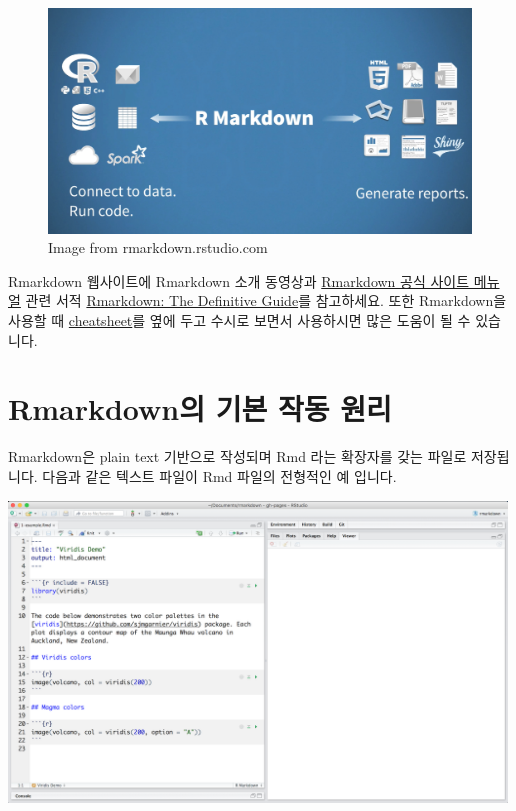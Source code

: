 \documentclass[
]{book}
\begin{document}
\begin{figure}
\centering
\includegraphics[width=5.20833in,height=\textheight]{images/rmarkdown/rmarkdown-01.PNG}
\caption{Image from rmarkdown.rstudio.com}
\end{figure}

Rmarkdown 웹사이트에 Rmarkdown 소개 동영상과 \href{https://rmarkdown.rstudio.com/lesson-1.html}{Rmarkdown 공식 사이트 메뉴얼} 관련 서적 \href{https://bookdown.org/yihui/rmarkdown/}{Rmarkdown: The Definitive Guide}를 참고하세요. 또한 Rmarkdown을 사용할 때 \href{https://github.com/rstudio/cheatsheets/raw/master/rmarkdown-2.0.pdf}{cheatsheet}를 옆에 두고 수시로 보면서 사용하시면 많은 도움이 될 수 있습니다.

\hypertarget{rmarkdownuxc758-uxae30uxbcf8-uxc791uxb3d9-uxc6d0uxb9ac}{%
\section{Rmarkdown의 기본 작동 원리}\label{rmarkdownuxc758-uxae30uxbcf8-uxc791uxb3d9-uxc6d0uxb9ac}}

Rmarkdown은 plain text 기반으로 작성되며 Rmd 라는 확장자를 갖는 파일로 저장됩니다. 다음과 같은 텍스트 파일이 Rmd 파일의 전형적인 예 입니다.

\includegraphics[width=5.20833in,height=\textheight]{images/rmarkdown/how-1-file.png}
\end{document}
